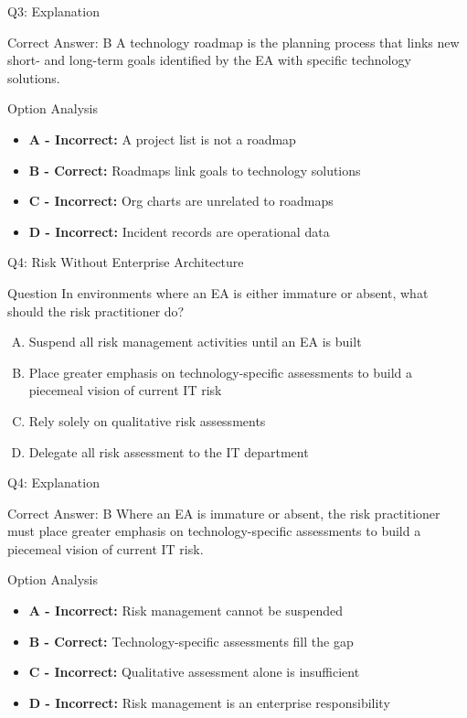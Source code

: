 \documentclass{beamer}
\begin{document}
	\begin{frame}{Q3: Explanation}
		\begin{block}{Correct Answer: B}
			A technology roadmap is the planning process that links new short- and long-term goals identified by the EA with specific technology solutions.
		\end{block}
		\begin{block}{Option Analysis}
			\begin{itemize}
				\item \textbf{A - Incorrect:} A project list is not a roadmap
				\item \textbf{B - Correct:} Roadmaps link goals to technology solutions
				\item \textbf{C - Incorrect:} Org charts are unrelated to roadmaps
				\item \textbf{D - Incorrect:} Incident records are operational data
			\end{itemize}
		\end{block}
	\end{frame}
	
	\begin{frame}{Q4: Risk Without Enterprise Architecture}
		\begin{block}{Question}
			In environments where an EA is either immature or absent, what should the risk practitioner do?
		\end{block}
		\begin{enumerate}[(A)]
			\item Suspend all risk management activities until an EA is built
			\item Place greater emphasis on technology-specific assessments to build a piecemeal vision of current IT risk
			\item Rely solely on qualitative risk assessments
			\item Delegate all risk assessment to the IT department
		\end{enumerate}
	\end{frame}
	
	\begin{frame}{Q4: Explanation}
		\begin{block}{Correct Answer: B}
			Where an EA is immature or absent, the risk practitioner must place greater emphasis on technology-specific assessments to build a piecemeal vision of current IT risk.
		\end{block}
		\begin{block}{Option Analysis}
			\begin{itemize}
				\item \textbf{A - Incorrect:} Risk management cannot be suspended
				\item \textbf{B - Correct:} Technology-specific assessments fill the gap
				\item \textbf{C - Incorrect:} Qualitative assessment alone is insufficient
				\item \textbf{D - Incorrect:} Risk management is an enterprise responsibility
			\end{itemize}
		\end{block}
	\end{frame}
	
\end{document}
